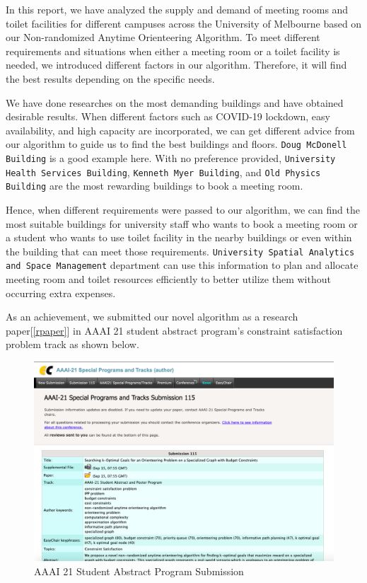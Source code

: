In this report, we have analyzed the supply and demand of meeting rooms and toilet facilities for different campuses across the University of Melbourne based on our Non-randomized Anytime Orienteering Algorithm. To meet different requirements and situations when either a meeting room or a toilet facility is needed, we introduced different factors in our algorithm. Therefore, it will find the best results depending on the specific needs. 

We have done researches on the most demanding buildings and have obtained desirable results. When different factors such as COVID-19 lockdown, easy availability, and high capacity are incorporated, we can get different advice from our algorithm to guide us to find the best buildings and floors. \texttt{Doug McDonell Building} is a good example here. With no preference provided, \texttt{University Health Services Building}, \texttt{Kenneth Myer Building}, and \texttt{Old Physics Building} are the most rewarding buildings to book a meeting room.

Hence, when different requirements were passed to our algorithm, we can find the most suitable buildings for university staff who wants to book a meeting room or a student who wants to use toilet facility in the nearby buildings or even within the building that can meet those requirements. \texttt{University Spatial Analytics and Space Management} department can use this information to plan and allocate meeting room and toilet resources efficiently to better utilize them without occurring extra expenses.

As an achievement, we submitted our novel algorithm as a research paper[\ref{rpaper}] in AAAI 21 student abstract program's constraint satisfaction problem track as shown below.

\begin{figure}[H]
\centering
\includegraphics[width=14cm]{resources/images/achieve1.png}
\caption{AAAI 21 Student Abstract Program Submission}
\label{fig:achieve1}
\end{figure}

